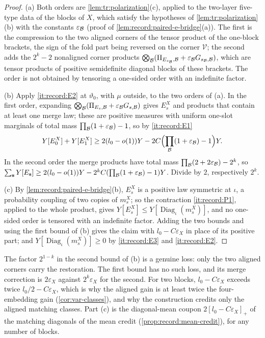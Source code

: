 \begin{proof}
(a) Both orders are \cref{lem:tr:polarization}(c), applied to the two-layer
five-type data of the blocks of $X$, which satisfy the hypotheses of
\cref{lem:tr:polarization}(b) with the constants $\varepsilon_\mathcal B$ (proof of
\cref{lem:record:paired-e-bridge}(a)). The first is the compression to the two
aligned corners of the tensor product of the one-block brackets, the sign of
the fold part being reversed on the corner $\mathcal V$; the second adds the
$2^k-2$ nonaligned corner products
$\bigotimes_\mathcal B(\Pi_{E_{s_\mathcal B},\mathcal B}+\varepsilon_\mathcal B G_{s_\mathcal B,\mathcal B})$, which are
tensor products of positive semidefinite diagonal blocks of these brackets.
The order is not obtained by tensoring a one-sided order with an indefinite
factor.

(b) Apply \ref{it:record:E2} at $\vartheta_0$, with $\mu$ outside, to the two
orders of (a). In the first order, expanding
$\bigotimes_\mathcal B(\Pi_{E_s,\mathcal B}+\varepsilon_\mathcal B G_{s,\mathcal B})$ gives $E^X_s$ and
products that contain at least one merge law; these are positive measures with
uniform one-slot marginals of total mass $\prod_\mathcal B(1+\varepsilon_\mathcal B)-1$, so by
\ref{it:record:E1}
\[
 Y[E^X_0]+Y[E^X_1]\ge2(l_0-o(1))Y-2C\Bigl(\prod_\mathcal B(1+\varepsilon_\mathcal B)-1\Bigr)Y.
\]
In the second order the merge products have total mass
$\prod_\mathcal B(2+2\varepsilon_\mathcal B)-2^k$, so
$\sum_{\mathbf s}Y[E_{\mathbf s}]\ge2(l_0-o(1))Y-2^kC(\prod_\mathcal B(1+\varepsilon_\mathcal B)
-1)Y$. Divide by $2$, respectively $2^k$.

(c) By \cref{lem:record:paired-e-bridge}(b), $E^X_s$ is a positive law symmetric
at $\iota$, a probability coupling of two copies of $m^X_s$; so the contraction
\ref{it:record:P1}, applied to the whole product, gives
$Y[E^X_s]\le Y[\operatorname{Diag}_\iota(m^X_s)]$, and no one-sided order is
tensored with an indefinite factor. Adding the two bounds and using the first
bound of (b) gives the claim with $l_0-C\varepsilon_X$ in place of its positive
part; and $Y[\operatorname{Diag}_\iota(m^X_s)]\ge0$ by \ref{it:record:E3} and
\ref{it:record:E2}.
\end{proof}

The factor $2^{1-k}$ in the second bound of (b) is a genuine loss: only the two
aligned corners carry the restoration. The first bound has no such loss, and
its merge correction is $2\varepsilon_X$ against $2^k\varepsilon_X$ for the second.
For two blocks, $l_0-C\varepsilon_X$ exceeds twice $l_0/2-C\varepsilon_X$, which is why
the aligned gain is at least twice the four-embedding gain
(\cref{cor:var-classes}), and why the construction credits only the aligned
matching classes. Part (c) is the diagonal-mean coupon $2[l_0-C\varepsilon_X]_+$
of the matching diagonals of the mean credit (\cref{prop:record:mean-credit}),
for any number of blocks.

